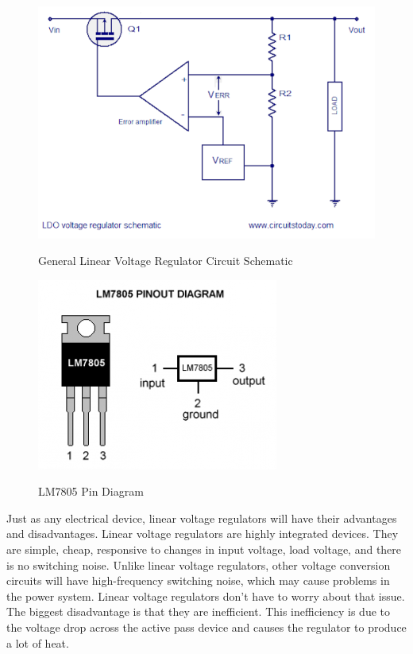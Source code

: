 \begin{figure}[H]
    \caption{General Linear Voltage Regulator Circuit Schematic}
    \centering
    \includegraphics[width=\textwidth]{images/Gen_Linear_Voltage_Regulator.png}
    \label{fig:general-linear-voltage-regulator}
\end{figure}
\begin{figure}[H]
    \caption{LM7805 Pin Diagram}
    \centering
    \includegraphics[width=\textwidth]{images/LM7805_pin_diagram.png}
    \label{fig:LM7805-pin-diagram}
\end{figure}
Just as any electrical device, linear voltage regulators will have their advantages and disadvantages. Linear voltage regulators are highly integrated devices. They are simple, cheap, responsive to changes in input voltage, load voltage, and there is no switching noise. Unlike linear voltage regulators, other voltage conversion circuits will have high-frequency switching noise, which may cause problems in the power system. Linear voltage regulators don’t have to worry about that issue. The biggest disadvantage is that they are inefficient. This inefficiency is due to the voltage drop across the active pass device and causes the regulator to produce a lot of heat.\par
